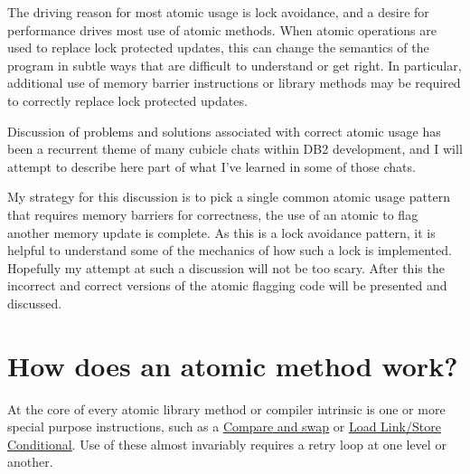 The driving reason for most atomic usage is lock avoidance, and a desire for performance drives most use of atomic methods.  When atomic operations are used to replace lock protected updates, this can change the semantics of the program in subtle ways that are difficult to understand or get right.  In particular, additional use of memory barrier instructions or library methods may be required to correctly replace lock protected updates.

Discussion of problems and solutions associated with correct atomic usage has been a recurrent theme of many cubicle chats within DB2 development, and I will attempt to describe here part of what I've learned in some of those chats.

My strategy for this discussion is to pick a single common atomic usage pattern that requires memory barriers for correctness, the use of an atomic to flag another memory update is complete.  As this is a lock avoidance pattern, it is helpful to understand some of the mechanics of how such a lock is implemented.  Hopefully my attempt at such a discussion will not be too scary.  After this the incorrect and correct versions of the atomic flagging code will be presented and discussed.


\section{How does an atomic method work?}

At the core of every atomic library method or compiler intrinsic is one or more special purpose instructions, such as a \href{http://en.wikipedia.org/wiki/Compare-and-swap}{Compare and swap} or \href{http://en.wikipedia.org/wiki/Load-Link/Store-Conditional}{Load Link/Store Conditional}.  Use of these almost invariably requires a retry loop at one level or another.

